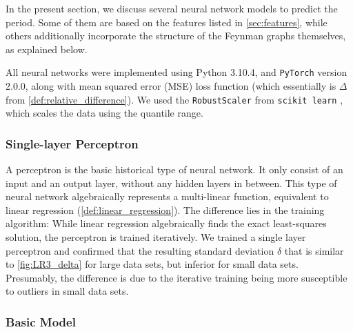 \documentclass[12pt]{article}
\numberwithin{equation}{section}
\begin{document}
In the present section, we discuss several neural network models  to predict the  period. Some of them are based on the features listed in \cref{sec:features}, while others additionally incorporate  the structure of the Feynman graphs themselves, as explained below. 

All neural networks  were implemented using Python 3.10.4, and \texttt{PyTorch} \cite{paszke_pytorch_2019} version 2.0.0, along with mean squared error (MSE) loss function (which essentially is $\Delta$ from \cref{def:relative_difference}). We used the \texttt{RobustScaler} from \texttt{scikit learn} \cite{pedregosa_scikitlearn_2012}, which scales the data using the quantile range. 

\subsubsection{Single-layer Perceptron}

A  perceptron \cite{rosenblatt_perceptron_1957} is the basic historical type of  neural network. It only consist of an input and an output layer, without any hidden layers in between.  This type of neural network algebraically represents a multi-linear function, equivalent to linear regression (\cref{def:linear_regression}). The difference lies in the training algorithm: While linear regression algebraically finds the exact least-squares solution, the perceptron is trained iteratively. We trained a single layer perceptron and confirmed that the resulting standard deviation $\delta$  that is similar to \cref{fig:LR3_delta} for large data sets, but inferior for small data sets. Presumably, the difference is due to the iterative training being more susceptible to  outliers in small data sets.
 


\subsubsection{Basic Model}\label{sec:basicmodel}
\end{document}
